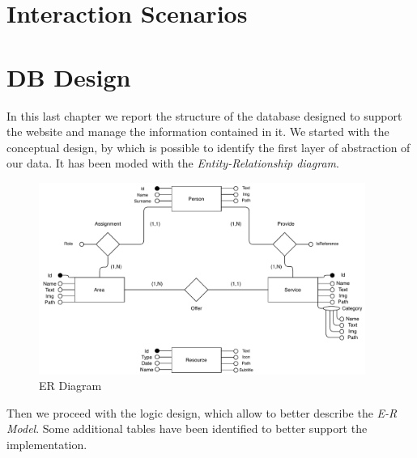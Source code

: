 \documentclass[12pt]{report}
\begin{document}
\chapter{Interaction Scenarios}

\chapter{DB Design}
In this last chapter we report the structure of the database designed 
to support the website and manage the information contained in it. 
We started with the conceptual design, by which is possible to identify
the first layer of abstraction of our data. It has been moded with the 
\emph{Entity-Relationship diagram}.\\
\begin{figure}[H]
	\centering
	\includegraphics[width=0.95\textwidth]{ER_model.pdf}
	\caption{ER Diagram}
\end{figure}
\noindent
Then we proceed with the logic design, which allow to better describe the
\emph{E-R Model}. Some additional tables have been identified to better 
support the implementation.
\clearpage
\end{document}
